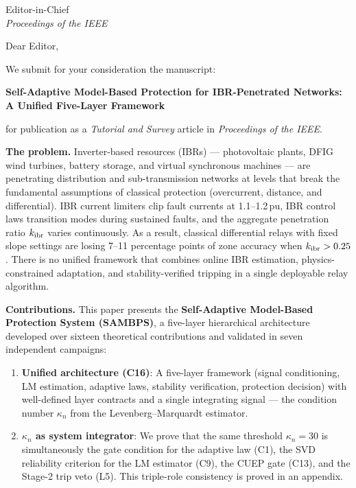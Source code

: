 \documentclass[11pt,a4paper]{letter}
\begin{document}
\begin{letter}{Editor-in-Chief\\
               \textit{Proceedings of the IEEE}}

\opening{Dear Editor,}

We submit for your consideration the manuscript:

\begin{center}
  \textbf{Self-Adaptive Model-Based Protection for IBR-Penetrated
  Networks: A Unified Five-Layer Framework}
\end{center}

for publication as a \textit{Tutorial and Survey} article in
\textit{Proceedings of the IEEE}.

\textbf{The problem.}
Inverter-based resources (IBRs) --- photovoltaic plants, DFIG wind
turbines, battery storage, and virtual synchronous machines --- are
penetrating distribution and sub-transmission networks at levels that
break the fundamental assumptions of classical protection (overcurrent,
distance, and differential).  IBR current limiters clip fault currents
at 1.1--1.2\,pu, IBR control laws transition modes during sustained
faults, and the aggregate penetration ratio $k_{\rm ibr}$ varies
continuously.  As a result, classical differential relays with fixed
slope settings are losing 7--11 percentage points of zone accuracy
when $k_{\rm ibr} > 0.25$.  There is no unified framework that
combines online IBR estimation, physics-constrained adaptation, and
stability-verified tripping in a single deployable relay algorithm.

\textbf{Contributions.}
This paper presents the \textbf{Self-Adaptive Model-Based Protection
System (SAMBPS)}, a five-layer hierarchical architecture developed
over sixteen theoretical contributions and validated in seven
independent campaigns:

\begin{enumerate}
  \item \textbf{Unified architecture (C16)}: A five-layer framework
        (signal conditioning, LM estimation, adaptive laws, stability
        verification, protection decision) with well-defined layer
        contracts and a single integrating signal --- the
        condition number $\kappa_n$ from the Levenberg--Marquardt
        estimator.

  \item \textbf{$\kappa_n$ as system integrator}: We prove that the
        same threshold $\kappa_n = 30$ is simultaneously the gate
        condition for the adaptive law (C1), the SVD reliability
        criterion for the LM estimator (C9), the CUEP gate (C13),
        and the Stage-2 trip veto (L5).  This triple-role consistency
        is proved in an appendix.


\end{enumerate}
\end{letter}
\end{document}

